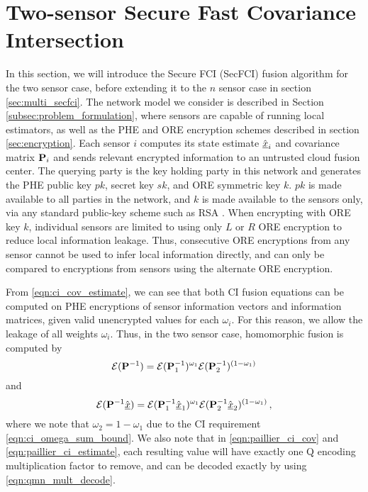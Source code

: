 \documentclass[letterpaper, 10 pt, conference]{ieeeconf}  %
\begin{document}
\section{Two-sensor Secure Fast Covariance Intersection} \label{sec:secfci}
In this section, we will introduce the Secure FCI (SecFCI) fusion algorithm for the two sensor case, before extending it to the $n$ sensor case in section \ref{sec:multi_secfci}. The network model we consider is described in Section \ref{subsec:problem_formulation}, where sensors are capable of running local estimators, as well as the PHE and ORE encryption schemes described in section \ref{sec:encryption}. Each sensor $i$ computes its state estimate $\hat{{\underline{x}}}_i$ and covariance matrix ${{\mathbf{P}}}_i$ and sends relevant encrypted information to an untrusted cloud fusion center. The querying party is the key holding party in this network and generates the PHE public key $pk$, secret key $sk$, and ORE symmetric key $k$. $pk$ is made available to all parties in the network, and $k$ is made available to the sensors only, via any standard public-key scheme such as RSA \cite{rivestMethodObtainingDigital1978}. When encrypting with ORE key $k$, individual sensors are limited to using only $L$ or $R$ ORE encryption to reduce local information leakage. Thus, consecutive ORE encryptions from any sensor cannot be used to infer local information directly, and can only be compared to encryptions from sensors using the alternate ORE encryption.

From \eqref{eqn:ci_cov_estimate}, we can see that both CI fusion equations can be computed on PHE encryptions of sensor information vectors and information matrices, given valid unencrypted values for each $\omega_i$. For this reason, we allow the leakage of all weights $\omega_i$. Thus, in the two sensor case, homomorphic fusion is computed by
\begin{equation}
   \mathcal{E}({{\mathbf{P}}}^{-1}) = \mathcal{E}({{\mathbf{P}}}^{-1}_1)^{\omega_1}\mathcal{E}({{\mathbf{P}}}^{-1}_2)^{(1 -\omega_1)} \label{eqn:paillier_ci_cov}
\end{equation}
and
\begin{equation}
   \mathcal{E}({{\mathbf{P}}}^{-1}\hat{{\underline{x}}}) = \mathcal{E}({{\mathbf{P}}}^{-1}_1\hat{{\underline{x}}}_1)^{\omega_1}\mathcal{E}({{\mathbf{P}}}^{-1}_2\hat{{\underline{x}}}_2)^{(1 - \omega_1)}\,, \label{eqn:paillier_ci_estimate}
\end{equation}
where we note that $\omega_2=1-\omega_1$ due to the CI requirement \eqref{eqn:ci_omega_sum_bound}. We also note that in \eqref{eqn:paillier_ci_cov} and \eqref{eqn:paillier_ci_estimate}, each resulting value will have exactly one Q encoding multiplication factor to remove, and can be decoded exactly by using \eqref{eqn:qmn_mult_decode}.
   
\end{document}
